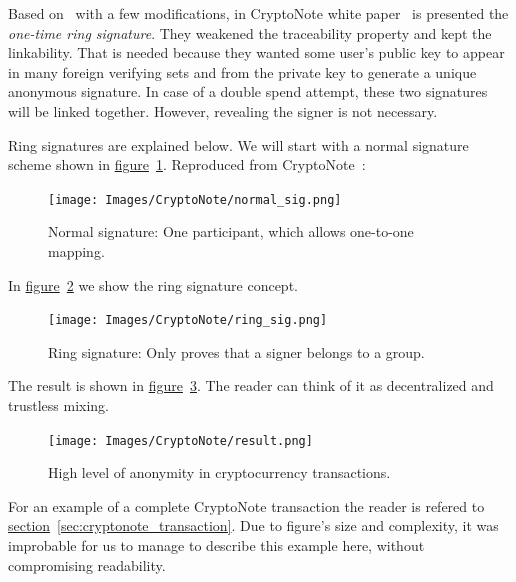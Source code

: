 Based on~\cite{traceable2} with a few modifications, in CryptoNote white paper~\cite{citeulike:14139412} is presented the \emph{one-time ring signature}. They weakened the traceability property and kept the linkability. That is needed because they wanted some user's public key to appear in many foreign verifying sets and from the private key to generate a unique anonymous signature. In case of a double spend attempt, these two signatures will be linked together. However, revealing the signer is not necessary.

Ring signatures are explained below. We will start with a normal signature scheme shown in \hyperref[fig:normal_sig]{figure}~\ref{fig:normal_sig}. Reproduced from CryptoNote~\cite{cryptonote}:
\vspace{0.5cm}
\begin{figure}[H]
  \centering
  \texttt{[image: Images/CryptoNote/normal\_sig.png]}
  \caption{Normal signature: One participant, which allows one-to-one mapping.~\cite{cryptonote}}
  \label{fig:normal_sig}
\end{figure}

In \hyperref[fig:ring_sig]{figure}~\ref{fig:ring_sig} we show the ring signature concept.
\vspace{0.5cm}
\begin{figure}[H]
  \centering
  \texttt{[image: Images/CryptoNote/ring\_sig.png]}
  \caption{Ring signature: Only proves that a signer belongs to a group.~\cite{cryptonote}}
  \label{fig:ring_sig}
\end{figure}

The result is shown in \hyperref[fig:result]{figure}~\ref{fig:result}. The reader can think of it as decentralized and trustless mixing.
\vspace{0.5cm}
\begin{figure}[H]
  \centering
  \texttt{[image: Images/CryptoNote/result.png]}
  \caption{High level of anonymity in cryptocurrency transactions.~\cite{cryptonote}}
  \label{fig:result}
\end{figure}

For an example of a complete CryptoNote transaction the reader is refered to  \hyperref[sec:cryptonote_transaction]{section}~\ref{sec:cryptonote_transaction}. Due to figure's size and complexity, it was improbable for us to manage to describe this example here, without compromising readability.

